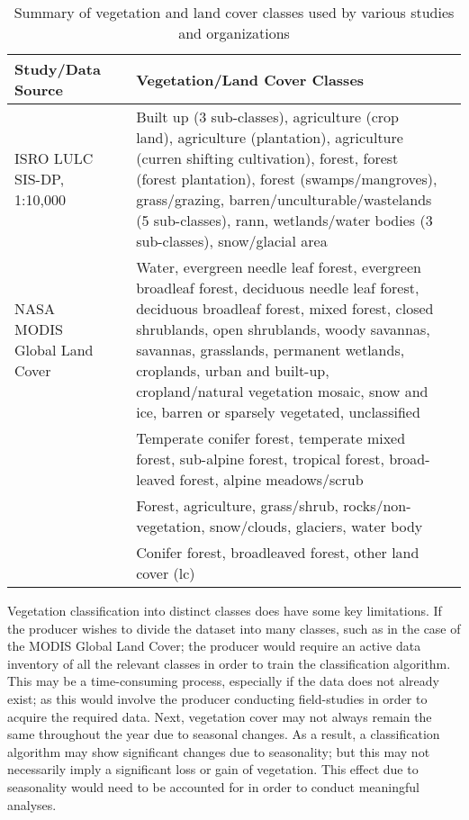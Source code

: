 \begin{table}[H]
	\small
	\def\arraystretch{1.7}
	\begin{threeparttable}
		\centering
		\caption{Summary of vegetation and land cover classes used by various studies and organizations}
		\label{table10}
		\begin{tabular}{L{5.4cm} L{0.3cm} p{8.65cm} L{0.01cm}}
			\toprule[0.25mm]
			Study/Data Source && Vegetation/Land Cover Classes &\\
			\midrule[0.35mm]
			ISRO LULC SIS-DP, 1:10,000  && Built up (3 sub-classes), agriculture (crop land), agriculture (plantation), agriculture (curren shifting cultivation), forest, forest  (forest plantation), forest (swamps/mangroves), grass/grazing, barren/unculturable/wastelands (5 sub-classes), rann, wetlands/water bodies (3 sub-classes), snow/glacial area&\\
			NASA MODIS Global Land Cover  && Water, evergreen needle leaf forest, evergreen broadleaf forest, deciduous needle leaf forest, deciduous broadleaf forest, mixed forest, closed shrublands, open shrublands, woody savannas, savannas, grasslands, permanent wetlands, croplands, urban and built-up, cropland/natural vegetation mosaic, snow and ice, barren or sparsely vegetated, unclassified &\\	
			\citealp{joshi2001}  && Temperate conifer forest, temperate mixed forest, sub-alpine forest, tropical forest, broad-leaved forest, alpine meadows/scrub &\\
			\citealp{HPRS2009}  && Forest, agriculture, grass/shrub, rocks/non-vegetation, snow/clouds, glaciers, water body &\\	
			\citealp{puletti2016}  && Conifer forest, broadleaved forest, other land cover (\ac{lc}) &\\	
			\bottomrule[0.25mm]
		\end{tabular}
	\end{threeparttable}
\end{table}

\justify
Vegetation classification into distinct classes does have some key limitations. If the producer wishes to divide the dataset into many classes, such as in the case of the MODIS Global Land Cover; the producer would require an active data inventory of all the relevant classes in order to train the classification algorithm. This may be a time-consuming process, especially if the data does not already exist; as this would involve the producer conducting field-studies in order to acquire the required data. Next, vegetation cover may not always remain the same throughout the year due to seasonal changes. As a result, a classification algorithm may show significant changes due to seasonality; but this may not necessarily imply a significant loss or gain of vegetation. This effect due to seasonality would need to be accounted for in order to conduct meaningful analyses. 

